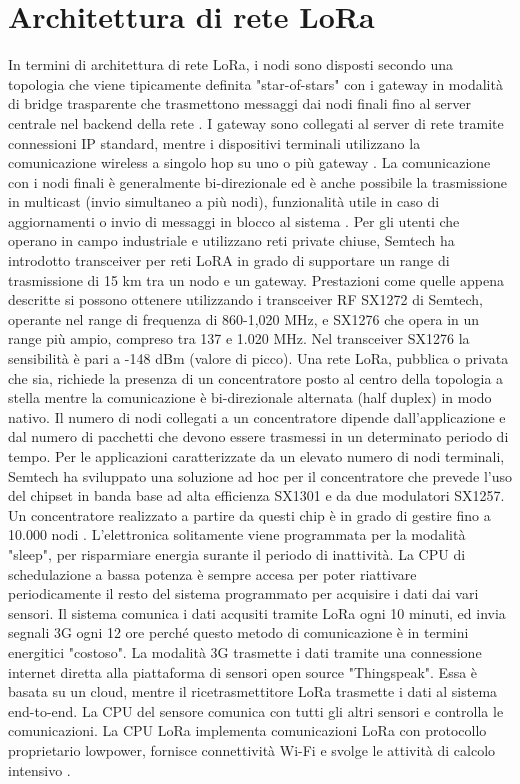 \documentclass[a4paper]{report} %
\begin{document}
\section{Architettura di rete LoRa}
In termini di architettura di rete LoRa, i nodi sono disposti secondo una topologia che viene tipicamente definita "star-of-stars" con i gateway in modalità di bridge trasparente che trasmettono messaggi dai nodi finali fino al server centrale nel backend della rete \cite{art:rif.27}.
I gateway sono collegati al server di rete tramite connessioni IP standard, mentre i dispositivi terminali utilizzano la comunicazione wireless a singolo hop su uno o più gateway \cite{art:rif.28}. 
La comunicazione con i nodi finali è generalmente bi-direzionale ed è anche possibile la trasmissione in multicast (invio simultaneo a più nodi), funzionalità utile in caso di aggiornamenti o invio di messaggi in blocco al sistema \cite{art:rif.27}. 
Per gli utenti che operano in campo industriale e utilizzano reti private chiuse, Semtech ha introdotto transceiver per reti LoRA in grado di supportare un range di trasmissione di 15 km tra un nodo e un gateway. Prestazioni come quelle appena descritte si possono ottenere utilizzando i transceiver RF SX1272 di Semtech, operante nel range di frequenza di 860-1,020 MHz, e SX1276 che opera in un range più ampio, compreso tra 137 e 1.020 MHz. Nel transceiver SX1276 la sensibilità è pari a -148 dBm (valore di picco). Una rete LoRa, pubblica o privata che sia, richiede la presenza di un concentratore posto al centro della topologia a stella mentre la comunicazione è bi-direzionale alternata (half duplex) in modo nativo. Il numero di nodi collegati a un concentratore dipende dall'applicazione e dal numero di pacchetti che devono essere trasmessi in un determinato periodo di tempo. Per le applicazioni caratterizzate da un elevato numero di nodi terminali, Semtech ha sviluppato una soluzione ad hoc per il concentratore che prevede l'uso del chipset in banda base ad alta efficienza SX1301 e da due modulatori SX1257. Un concentratore realizzato a partire da questi chip è in grado di gestire fino a 10.000 nodi \cite{art:rif.28}.
L'elettronica solitamente viene programmata per la modalità "sleep", per risparmiare energia surante il periodo di inattività. La CPU di schedulazione a bassa potenza è sempre accesa per poter riattivare periodicamente il resto del sistema programmato per acquisire i dati dai vari sensori. Il sistema comunica i dati acqusiti tramite LoRa ogni 10 minuti, ed invia segnali 3G ogni 12 ore perché questo metodo di comunicazione è in termini energitici "costoso". La modalità 3G trasmette i dati tramite una connessione internet diretta alla piattaforma di sensori open source "Thingspeak". Essa è basata su un cloud, mentre il ricetrasmettitore LoRa trasmette i dati al sistema end-to-end. La CPU del sensore comunica con tutti gli altri sensori e controlla le comunicazioni. La CPU LoRa implementa comunicazioni LoRa con protocollo proprietario lowpower, fornisce connettività Wi-Fi e svolge le attività di calcolo intensivo \cite{art:rif.43}. 
\end{document}
